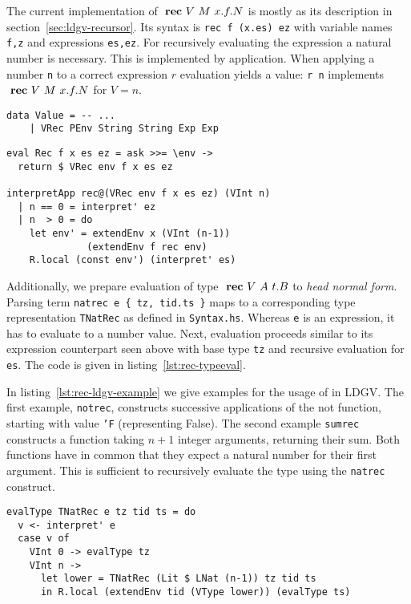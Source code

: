 The current implementation of $\text{ \textbf{rec} } V~M~x.f.N$ is mostly as its description in section~\ref{sec:ldgv-recursor}. Its syntax is \texttt{rec f (x.es) ez} with variable names \texttt{f,z} and expressions \texttt{es,ez}. For recursively evaluating the expression a natural number is necessary. This is implemented by application. When applying a number \texttt{n} to a correct \rec expression $r$ evaluation yields a value: \texttt{r n} implements $\text{ \textbf{rec} } V~M~x.f.N$ for $V=n$.

\begin{lstlisting}[float,
	label=lst:rec-typeext,
	caption=Haskell: Introducing value representation of \\ \rec (\texttt{ProcessEnvironment.hs})]
data Value = -- ...
    | VRec PEnv String String Exp Exp
\end{lstlisting}

\begin{lstlisting}[float,
	label=lst:rec-eval,
	caption=Haskell: Evaluation of \rec (\texttt{Interpreter.hs})]
eval Rec f x es ez = ask >>= \env ->
  return $ VRec env f x es ez
  
interpretApp rec@(VRec env f x es ez) (VInt n)
  | n == 0 = interpret' ez
  | n  > 0 = do
    let env' = extendEnv x (VInt (n-1))
              (extendEnv f rec env)
    R.local (const env') (interpret' es)
\end{lstlisting}

Additionally, we prepare evaluation of type $\text{ \textbf{rec} } V~A~t.B$ to \emph{head normal form}. Parsing term \texttt{natrec e \{ tz, tid.ts \}} maps to a corresponding type representation \texttt{TNatRec} as defined in \texttt{Syntax.hs}. Whereas \texttt{e} is an expression, it has to evaluate to a number value. Next, evaluation proceeds similar to its expression counterpart seen above with base type \texttt{tz} and recursive evaluation for \texttt{es}. The code is given in listing~\ref{lst:rec-typeeval}.

In listing~\ref{lst:rec-ldgv-example} we give examples for the usage of \rec in  LDGV. The first example, \texttt{notrec}, constructs successive applications of the not function, starting with value \texttt{'F} (representing False). The second example \texttt{sumrec} constructs a function taking $n+1$ integer arguments, returning their sum. Both functions have in common that they expect a natural number for their first argument. This is sufficient to recursively evaluate the type using the \texttt{natrec} construct.

\begin{lstlisting}[float,
	label=lst:rec-typeeval,
	caption=Haskell: Evaluation of \rec type to HNF(\texttt{Interpreter.hs})]
evalType TNatRec e tz tid ts = do
  v <- interpret' e
  case v of
    VInt 0 -> evalType tz
    VInt n ->
      let lower = TNatRec (Lit $ LNat (n-1)) tz tid ts
      in R.local (extendEnv tid (VType lower)) (evalType ts)
\end{lstlisting}

